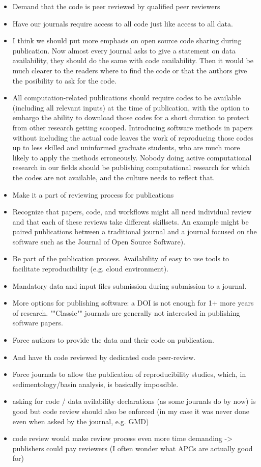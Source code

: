 \documentclass{article}
\begin{document}
\begin{itemize}
	\item Demand that the code is peer reviewed by qualified peer reviewers
	\item Have our journals require access to all code just like access to all data.
	\item I think we should put more emphasis on open source code sharing during publication. Now almost every journal asks to give a statement on data availability, they should do the same with code availability. Then it would be much clearer to the readers where to find the code or that the authors give the posibility to ask for the code.
	\item All computation-related publications should require codes to be available (including all relevant inputs) at the time of publication, with the option to embargo the ability to download those codes for a short duration to protect from other research getting scooped. Introducing software methods in papers without including the actual code leaves the work of reproducing those codes up to less skilled and uninformed graduate students, who are much more likely to apply the methods erroneously. Nobody doing active computational research in our fields should be publishing computational research for which the codes are not available, and the culture needs to reflect that.
	\item Make it a part of reviewing process for publications
	\item Recognize that papers, code, and workflows might all need individual review and that each of these reviews take different skillsets. An example might be paired publications between a traditional journal and a journal focused on the software such as the Journal of Open Source Software).
	\item Be part of the publication process. Availability of easy to use tools to facilitate reproducibility (e.g. cloud environment).
	\item Mandatory data and input files submission during submission to a journal.
	\item More options for publishing software: a DOI is not enough for 1+ more years of research. ""Classic"" journals are generally not interested in publishing software papers.
	\item Force authors to provide the data and their code on publication.
	\item And have th code reviewed by dedicated code peer-review.
	\item Force journals to allow the publication of reproducibility studies, which, in sedimentology/basin analysis, is basically impossible.
	\item asking for code / data avilability declarations (as some journals do by now) is good but code review should also be enforced (in my case it was never done even when asked by the journal, e.g. GMD)
	\item code review would make review process even more time demanding -> publishers could pay reviewers (I often wonder what APCs are actually good for)
\end{itemize}
\end{document}
